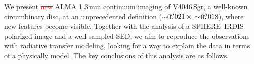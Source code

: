 \documentclass[fleqn,usenatbib,useAMS]{mnras}
\newcommand{\red}[1]{\textcolor{red}{#1}}
\begin{document}
We present \red{\sout{new}} ALMA 1.3\,mm continuum imaging of V4046\,Sgr, a well-known circumbinary disc, at an unprecedented definition ($\sim$0$\hbox{$.\!\!^{\prime\prime}$}021 \, \times \, \sim$0$\hbox{$.\!\!^{\prime\prime}$}018$), where new features become visible. Together with the analysis of a SPHERE--IRDIS polarized image and a well-sampled SED, we aim to reproduce the observations with radiative transfer modeling, looking for a way to explain the data in terms of a physically model. The key conclusions of this analysis are as follows.
\end{document}
